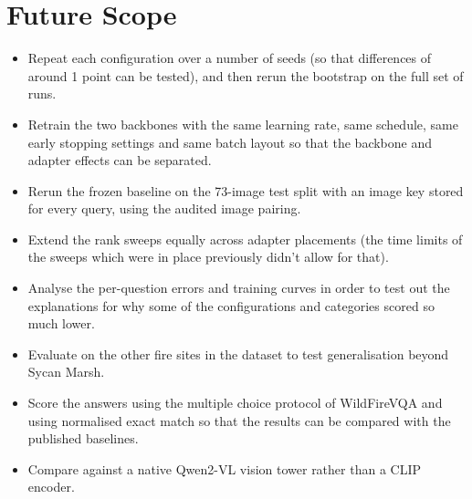 \documentclass[12pt]{report}
\begin{document}
\section{Future Scope}
\begin{itemize}[leftmargin=0.5in, itemsep=2pt]
  \item Repeat each configuration over a number of seeds (so that differences of around 1 point can be tested), and then rerun the bootstrap on the full set of runs.
  \item Retrain the two backbones with the same learning rate, same schedule, same early stopping settings and same batch layout so that the backbone and adapter effects can be separated.
  \item Rerun the frozen baseline on the 73-image test split with an image key stored for every query, using the audited image pairing.
  \item Extend the rank sweeps equally across adapter placements (the time limits of the sweeps which were in place previously didn't allow for that).
  \item Analyse the per-question errors and training curves in order to test out the explanations for why some of the configurations and categories scored so much lower.
  \item Evaluate on the other fire sites in the dataset to test generalisation beyond Sycan Marsh.
  \item Score the answers using the multiple choice protocol of WildFireVQA and using normalised exact match so that the results can be compared with the published baselines.
  \item Compare against a native Qwen2-VL vision tower rather than a CLIP encoder.
\end{itemize}
\clearpage{}
{}
\begin{singlespace}

\nocite{*}

\end{singlespace}
\end{document}
